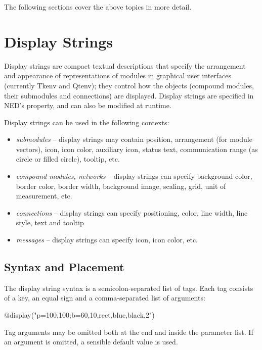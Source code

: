 The following sections cover the above topics in more detail.


\section{Display Strings}
\label{sec:ch-graphics:display-strings}

Display strings are compact textual descriptions
that specify the arrangement and appearance of representations of modules
in graphical user interfaces (currently Tkenv and Qtenv); they control how
the objects (compound modules, their submodules and connections) are
displayed. Display strings are specified in NED's 
property, and can also be modified at runtime.

Display strings can be used in the following contexts:
\begin{itemize}
  \item \textit{submodules} -- display strings may contain position, arrangement
        (for module vectors), icon, icon color, auxiliary icon, status text,
        communication range (as circle or filled circle), tooltip, etc.
  \item \textit{compound modules, networks} -- display strings can specify
        background color, border color, border width,
        background image, scaling, grid, unit of measurement, etc.
  \item \textit{connections} -- display strings can specify positioning, color,
        line width, line style, text and tooltip
  \item \textit{messages} -- display strings can specify icon, icon color, etc.
\end{itemize}


\subsection{Syntax and Placement}

The display string syntax is a semicolon-separated list of tags.
Each tag consists of a key, an equal sign and a comma-separated list of
arguments:

\begin{ned}
@display("p=100,100;b=60,10,rect,blue,black,2")
\end{ned}

Tag arguments may be omitted both at the end and inside the
parameter list. If an argument is omitted, a sensible default value is used.

